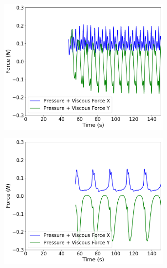 \begin{figure}[h!]
    \centering
    \begin{subfigure}[t]{0.31\textwidth}
        \includegraphics[width=0.95\textwidth, height=0.18\textheight]{Figures/4/OSCg0i37.png}
    \end{subfigure}
    \begin{subfigure}[t]{0.31\textwidth}
        \includegraphics[width=0.95\textwidth, height=0.18\textheight]{Figures/4/OSCg0i38.png}
    \end{subfigure}
    \begin{subfigure}[t]{0.31\textwidth}

\end{subfigure}
\end{figure}

